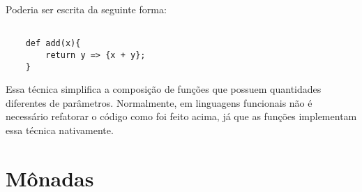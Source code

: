 Poderia ser escrita da seguinte forma:

\begin{lstlisting}[caption={Exemplo de Currying},label=currex]

    def add(x){
        return y => {x + y};
    }

\end{lstlisting}

Essa técnica simplifica a composição de funções 
que possuem quantidades diferentes de parâmetros. 
Normalmente, em linguagens funcionais não é 
necessário refatorar o código como foi feito 
acima, já que as funções implementam essa técnica 
nativamente. \cite{realworldhaskell}



\section{Mônadas}

